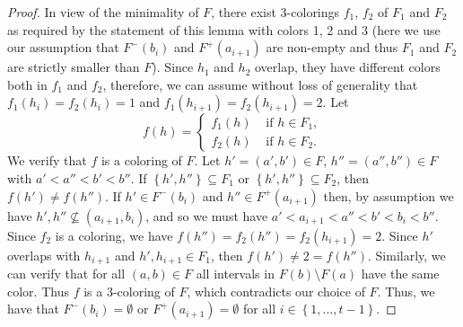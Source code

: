 \documentclass[12pt]{article}
\theoremstyle{definition}
\begin{document}
\begin{proof}
        In view of the minimality of
        $F$, there exist 3-colorings
        $f_1$, $f_2$ of $F_1$ and $F_2$ as required
        by the statement of this lemma
        with colors 1, 2 and 3 (here
        we use our assumption that
        $F^{-}\left(b_{i}\right)$ 
        and $F^{+}\left(a_{i+1}\right)$ 
        are non-empty and thus
        $F_{1}$ and $F_{2}$ are
        strictly smaller than $F$).
        Since $h_1$ and $h_2$ overlap,
        they have different colors
        both in $f_1$ and $f_2$, therefore,
        we can assume without loss of 
        generality that
        $f_1\left(h_{i}\right) = f_2\left(h_{i}\right) = 1$
        and $f_{1}\left(h_{i+1}\right) = 
        f_2\left(h_{i+1}\right) = 2$.
        Let
        \begin{equation*}
            f\left(h\right) = 
            \begin{cases}
                f_1\left(h\right) &\text{ if } h \in F_1, \\
                f_2\left(h\right) &\text{ if } h \in F_{2}.
            \end{cases}
        \end{equation*}
        We verify that $f$ 
        is a coloring of $F$. Let
        $h' = \left(a', b'\right) \in F$,
        $h'' = \left(a'', b''\right) \in F$
        with $a' < a'' < b' < b''$.
        If $\left\{h', h''\right\} \subseteq F_1$ 
        or $\left\{h', h''\right\} \subseteq F_2$,
        then $f\left(h'\right) \neq 
        f\left(h''\right)$.
        If $h' \in F^{-}\left(b_{i}\right)$ 
        and $h'' \in F^{+}\left(a_{i+1}\right)$
        then, by assumption
        we have
        $h', h'' \not \subseteq \left(a_{i+1}, b_{i}\right)$,
        and so we must have $a' < a_{i+1} < 
        a'' < b' < b_{i} < b''$. 
        Since $f_2$ is a coloring,
        we have $f\left(h''\right) =
        f_2\left(h''\right) =
        f_2\left(h_{i+1}\right) = 2$.
        Since $h'$ overlaps with $h_{i+1}$
        and $h', h_{i+1}
        \in F_1$, then $f\left(h'\right)
        \neq 2 = f\left(h''\right)$.
        Similarly, 
        we can verify
        that for all $\left(a, b\right) \in F$
        all intervals in $F\left(b\right)
        \setminus F\left(a\right)$
        have the same color.
        Thus
        $f$ is a 3-coloring of $F$,
        which contradicts our choice of $F$.
        Thus, we have that
        $F^{-}\left(b_{i}\right) = \emptyset$ or
        $F^{+}\left(a_{i+1}\right) = \emptyset$
        for all $i \in \left\{1, \ldots, t-1\right\}$.


\end{proof}
\end{document}
